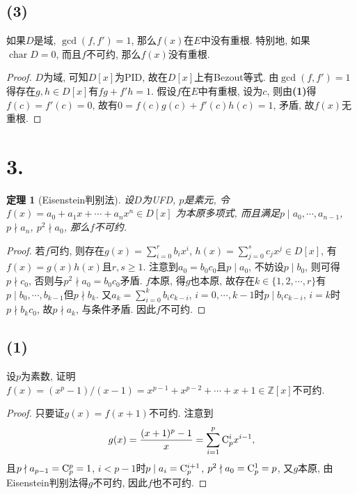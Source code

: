 \documentclass[12pt, a4paper, fontset=windows]{ctexart}
\newcommand{\Z}{\mathbb{Z}}
\newcommand{\ch}{\operatorname{char}}
\newtheorem*{theorem}{定理}
\begin{document}
\subsection*{(3)}
\label{irr-no-dbl-rt}

如果$D$是域, $\gcd(f,f')=1$, 那么$f(x)$在$E$中没有重根. 
特别地, 如果$\ch D=0$, 而且$f$不可约, 那么$f(x)$没有重根. 

\begin{proof}
$D$为域, 可知$D[x]$为PID, 故在$D[x]$上有Bezout等式. 
由$\gcd(f,f')=1$得存在$g,h\in D[x]$有$fg+f'h=1$. 
假设$f$在$E$中有重根, 设为$c$, 则由{\bf (1)}得$f(c)=f'(c)=0$, 
故有$0=f(c)g(c)+f'(c)h(c)=1$, 矛盾, 故$f(x)$无重根. 
\end{proof}

\section*{3.}
\label{eisenstein}

\begin{theorem}[Eisenstein判别法]
设$D$为UFD, $p$是素元, 令$f(x)=a_0+a_1x+\cdots+a_nx^n\in D[x]$
为本原多项式, 而且满足$p\mid a_0,\cdots,a_{n-1}$, $p\nmid a_n$, 
$p^2\nmid a_0$, 那么$f$不可约. 
\end{theorem}

\begin{proof}
若$f$可约, 则存在$g(x)=\sum^r_{i=0}b_ix^i$, $h(x)=\sum^s_{j=0}c_jx^j\in D[x]$, 
有$f(x)=g(x)h(x)$且$r,s\ge 1$. 注意到$a_0=b_0c_0$且$p\mid a_0$, 
不妨设$p\mid b_0$, 则可得$p\nmid c_0$, 否则与$p^2\nmid a_0=b_0c_0$矛盾. 
$f$本原, 得$g$也本原, 故存在$k\in\{1,2,\cdots,r\}$有
$p\mid b_0,\cdots,b_{k-1}$但$p\nmid b_k$. 又$a_k=\sum^k_{i=0}b_ic_{k-i}$, 
$i=0,\cdots,k-1$时$p\mid b_ic_{k-i}$, $i=k$时$p\nmid b_kc_0$, 
故$p\nmid a_k$, 与条件矛盾. 因此$f$不可约. 
\end{proof}

\subsection*{(1)}

设$p$为素数, 证明$f(x)=(x^p-1)/(x-1)=x^{p-1}+x^{p-2}+\cdots+x+1\in\Z[x]$不可约. 

\begin{proof}
只要证$g(x)=f(x+1)$不可约. 注意到
\[g(x)=\frac{(x+1)^p-1}{x}=\sum^p_{i=1}{\rm C}^i_px^{i-1},\]
且$p\nmid a_{p-1}={\rm C}^p_p=1$, $i<p-1$时$p\mid a_i={\rm C}^{i+1}_p$, 
$p^2\nmid a_0={\rm C}^1_p=p$, 又$g$本原, 由Eisenstein判别法得$g$不可约, 因此$f$也不可约. 
\end{proof}
\end{document}

